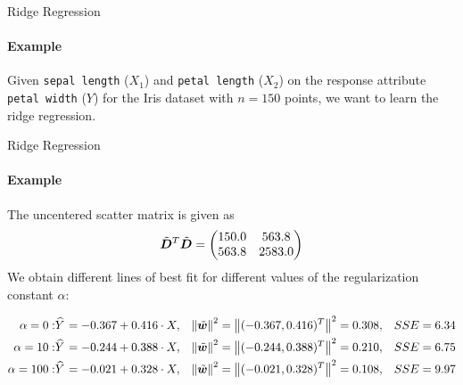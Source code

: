 \begin{frame}{Ridge Regression}
\framesubtitle{Example}

Given  
{\tt sepal length} ($X_1$) and {\tt petal
    length} ($X_2$) on the response attribute {\tt petal width} ($Y$)
for the Iris dataset with $n=150$ points, we want to learn the ridge regression. 

\centering
{}
\end{frame}

\begin{frame}{Ridge Regression}
\framesubtitle{Example}
    The uncentered scatter matrix is given as
    \begin{align*}
        \tilde{{\boldsymbol D}}^T\tilde{{\boldsymbol D}} = \begin{pmatrix} 
        150.0 &  563.8\\
        563.8 & 2583.0\\
         \end{pmatrix}
    \end{align*}
We obtain different lines of best
    fit for different values of the regularization constant $\alpha$:
\begin{small}
    \begin{align*}
        \alpha = 0: & \mkern 1.5mu\widehat{\mkern-1.5muY}\mkern 1.5mu = -0.367 + 0.416 \cdot X, 
        & \left\lVert\tilde{{\boldsymbol w}}\right\rVert^2 & = \left\lVert(-0.367, 0.416)^T\right\rVert^2 = 0.308, 
        & SSE & = 6.34\\
        \alpha = 10: & \mkern 1.5mu\widehat{\mkern-1.5muY}\mkern 1.5mu = -0.244 + 0.388 \cdot X,
        & \left\lVert\tilde{{\boldsymbol w}}\right\rVert^2 & = \left\lVert(-0.244, 0.388)^T\right\rVert^2 = 0.210,
       & SSE & = 6.75 \\
       \alpha = 100: & \mkern 1.5mu\widehat{\mkern-1.5muY}\mkern 1.5mu = -0.021 + 0.328 \cdot X,
       & \left\lVert\tilde{{\boldsymbol w}}\right\rVert^2 & = \left\lVert(-0.021, 0.328)^T\right\rVert^2 = 0.108,
        & SSE & = 9.97
    \end{align*}
\end{small}
\end{frame}

